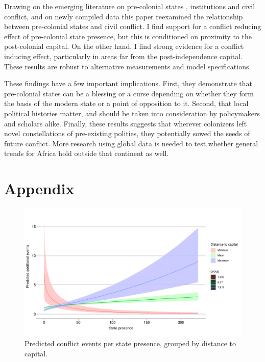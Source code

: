 \documentclass[12pt]{article}
\begin{document}
Drawing on the emerging literature on pre-colonial states \citep{Paine2019,
Depetris-Chauvin2016}, institutions \citep{Wig2016, Englebert2002,
Michalopoulos2018} and civil conflict, and on newly compiled data this paper
reexamined the relationship between pre-colonial states and civil conflict. I
find support for a conflict reducing effect of pre-colonial state presence, but
this is conditioned on proximity to the post-colonial capital. On the other
hand, I find strong evidence for a conflict inducing effect, particularly in
areas far from the post-independence capital. These results are robust to
alternative measurements and model specifications.

These findings have a few important implications. First, they demonstrate that
pre-colonial states can be a blessing or a curse depending on whether they form
the basis of the modern state or a point of opposition to it. Second, that local
political histories matter, and should be taken into consideration by
policymakers and scholars alike. Finally, these results suggests that wherever
colonizers left novel constellations of pre-existing polities, they potentially
sowed the seeds of future conflict. More research using global data is needed to
test whether general trends for Africa hold outside that continent as well.


\pagebreak




\pagebreak
\section*{Appendix}









\begin{figure}[htpb]
	\centering
	\includegraphics[width=\linewidth]{"../R/Output/SBzinbplot.pdf"}
	\caption{Predicted conflict events per state presence, grouped by
	distance to capital.}
	\label{state_int}
\end{figure}
\end{document}
